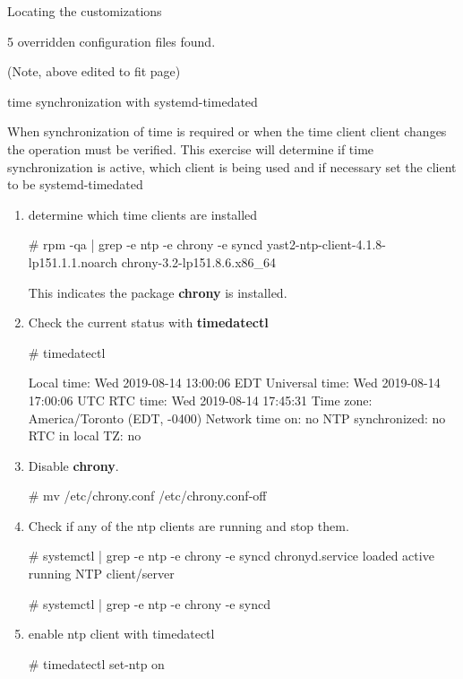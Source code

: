 \begin{Lab}
\begin{exe}{Locating the customizations}
\begin{enumerate}
\begin{rawscriptsize}
5 overridden configuration files found.

			\end{rawscriptsize}
(Note, above edited to fit page) 
	\end{enumerate}



\end{exe}

\begin{exe}{time synchronization with systemd-timedated}

	When synchronization of time is required or when the time client
	client changes the operation must be verified. This exercise will determine
	if time synchronization is active, which client is being used and 
	if necessary 
	set the client to be systemd-timedated

	\begin{enumerate} 
	\item determine which time clients are installed
\begin{raw}
# rpm -qa | grep -e ntp -e chrony -e syncd
yast2-ntp-client-4.1.8-lp151.1.1.noarch
chrony-3.2-lp151.8.6.x86_64
\end{raw}
	This indicates the package \textbf{chrony} is installed. 

	\item 
	Check the current status with \textbf{timedatectl} 
	\begin{raw}
# timedatectl 

      Local time: Wed 2019-08-14 13:00:06 EDT
  Universal time: Wed 2019-08-14 17:00:06 UTC
        RTC time: Wed 2019-08-14 17:45:31
       Time zone: America/Toronto (EDT, -0400)
 Network time on: no
NTP synchronized: no
 RTC in local TZ: no

	\end{raw}
	
	\item

	Disable \textbf{chrony}.
	\begin{raw}
# mv /etc/chrony.conf  /etc/chrony.conf-off 
	\end{raw}

	\item Check if any of the ntp clients are running and stop them.
		\begin{raw}
# systemctl | grep -e ntp -e chrony -e syncd
chronyd.service    loaded active running   NTP client/server

# systemctl | grep -e ntp -e chrony -e syncd
		\end{raw}
		\item enable ntp client with timedatectl
		\begin{raw}
# timedatectl set-ntp on
		\end{raw}


\end{enumerate}
\end{exe}
\end{Lab}
